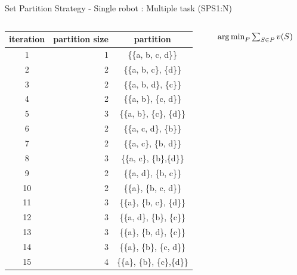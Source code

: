     \begin{frame}[fragile]{Set Partition Strategy - Single robot : Multiple task (SPS1:N)}
        \begin{columns}
           \begin{column}{.7\textwidth}
               \begin{center}
                   \begin{tabular}{|c|r|c|} \hline
                   \textbf{iteration} & \textbf{partition size} & \textbf{partition} \\ \hline
                   1    & 1    & \{\{a, b, c, d\}\}   \\
                   2    & 2    & \{\{a, b, c\}, \{d\}\}   \\
                   3    & 2    & \{\{a, b, d\}, \{c\}\}   \\
                   4    & 2    & \{\{a, b\}, \{c, d\}\}   \\
                   5    & 3    & \{\{a, b\}, \{c\}, \{d\}\}   \\
                   6    & 2    & \{\{a, c, d\}, \{b\}\}   \\
                   7    & 2    & \{\{a, c\}, \{b, d\}\}   \\
                   8    & 3    & \{\{a, c\}, \{b\},\{d\}\}   \\
                   9    & 2    & \{\{a, d\}, \{b, c\}\}   \\
                   10   & 2    & \{\{a\}, \{b, c, d\}\}   \\
                   11   & 3    & \{\{a\}, \{b, c\}, \{d\}\}   \\
                   12   & 3    & \{\{a, d\}, \{b\}, \{c\}\}   \\
                   13   & 3    & \{\{a\}, \{b, d\}, \{c\}\}   \\
                   14   & 3    & \{\{a\}, \{b\}, \{c, d\}\}   \\
                   15   & 4    & \{\{a\}, \{b\}, \{c\},\{d\}\}   \\ \hline       
                   \end{tabular}
                 \end{center}
           \end{column}
           \begin{column}{.4\textwidth}
            \begin{center}
           $\operatorname*{arg\,min}_{P} \sum_{S \in P} v(S)$
            \end{center}
           \begin{figure}

\end{figure}
\end{column}
\end{columns}
\end{frame}
